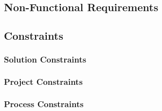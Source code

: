 \subsection{Non-Functional Requirements}
\subsection{Constraints}
\subsubsection{Solution Constraints}
\subsubsection{Project Constraints}
\subsubsection{Process Constraints}